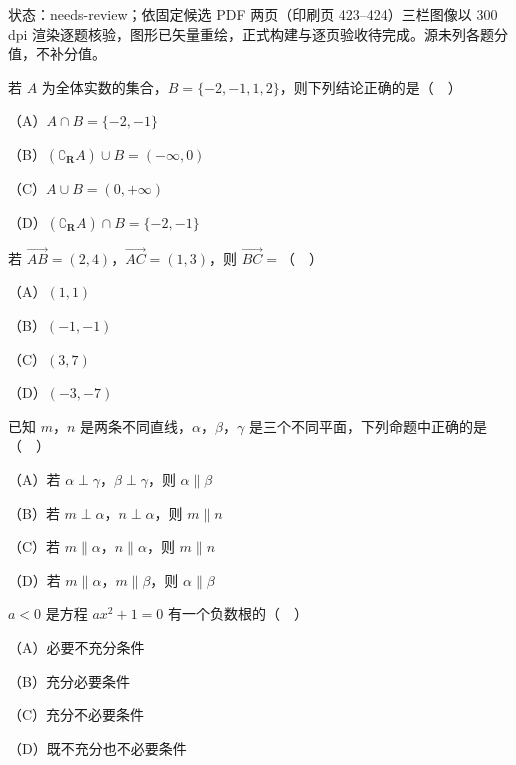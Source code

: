 

状态：needs-review；依固定候选 PDF 两页（印刷页 423–424）三栏图像以 300 dpi 渲染逐题核验，图形已矢量重绘，正式构建与逐页验收待完成。源未列各题分值，不补分值。


\begin{question}
若 $A$ 为全体实数的集合，$B=\{-2,-1,1,2\}$，则下列结论正确的是（　）

（A）$A\cap B=\{-2,-1\}$

（B）$(\complement_{\mathbf R}A)\cup B=(-\infty,0)$

（C）$A\cup B=(0,+\infty)$

（D）$(\complement_{\mathbf R}A)\cap B=\{-2,-1\}$

\end{question}
\begin{question}
若 $\overrightarrow{AB}=(2,4)$，$\overrightarrow{AC}=(1,3)$，则 $\overrightarrow{BC}=$（　）

（A）$(1,1)$

（B）$(-1,-1)$

（C）$(3,7)$

（D）$(-3,-7)$

\end{question}
\begin{question}
已知 $m$，$n$ 是两条不同直线，$\alpha$，$\beta$，$\gamma$ 是三个不同平面，下列命题中正确的是（　）

（A）若 $\alpha\perp\gamma$，$\beta\perp\gamma$，则 $\alpha\parallel\beta$

（B）若 $m\perp\alpha$，$n\perp\alpha$，则 $m\parallel n$

（C）若 $m\parallel\alpha$，$n\parallel\alpha$，则 $m\parallel n$

（D）若 $m\parallel\alpha$，$m\parallel\beta$，则 $\alpha\parallel\beta$

\end{question}
\begin{question}
$a<0$ 是方程 $ax^2+1=0$ 有一个负数根的（　）

（A）必要不充分条件

（B）充分必要条件

（C）充分不必要条件

（D）既不充分也不必要条件

\end{question}

